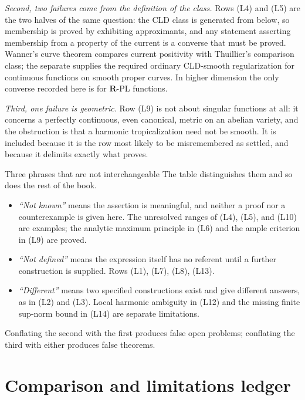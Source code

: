 \emph{Second, two failures come from the definition of the class.}  Rows
(L4) and (L5) are the two halves of the same question: the CLD class is
generated from below, so membership is proved by exhibiting approximants,
and any statement asserting membership from a property of the current is a
converse that must be proved.  Wanner's curve theorem compares current
positivity with Thuillier's comparison class; the separate
 supplies the required
ordinary CLD-smooth regularization for continuous functions on smooth proper
curves.  In higher dimension the only converse recorded here is for
$\mathbf R$-PL functions.

\emph{Third, one failure is geometric.}  Row (L9) is not about singular
functions at all: it concerns a perfectly continuous, even canonical, metric
on an abelian variety, and the obstruction is that a harmonic
tropicalization need not be smooth.  It is included because it is the row
most likely to be misremembered as settled, and because it delimits exactly
what  proves.

\noindent\begin{minipage}{\textwidth}
\begin{warning}{Three phrases that are not interchangeable}
The table distinguishes them and so does the rest of the book.
\begin{itemize}
\item \emph{``Not known''} means the assertion is meaningful, and neither a
 proof nor a counterexample is given here.  The unresolved ranges of (L4), (L5), and (L10) are examples;
 the analytic maximum principle in (L6) and the ample criterion in (L9)
 are proved.
\item \emph{``Not defined''} means the expression itself has no referent
 until a further construction is supplied.  Rows (L1), (L7), (L8), (L13).
\item \emph{``Different''} means two specified constructions exist and give different answers, as in
 (L2) and (L3).  Local harmonic ambiguity in (L12) and the missing finite
 sup-norm bound in (L14) are separate limitations.
\end{itemize}
Conflating the second with the first produces false open problems;
conflating the third with either produces false theorems.
\end{warning}
\end{minipage}\par

\section{Comparison and limitations ledger}
\label{sec:ch19-ledger}


